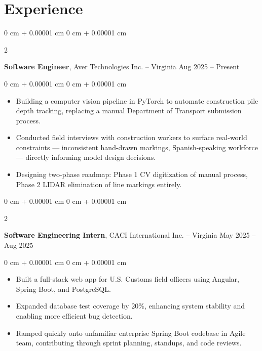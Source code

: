 \documentclass[10pt, letterpaper]{article}
\newenvironment{highlights}{
    \begin{itemize}[
        topsep=0.3 cm,
        parsep=0.05 cm,
        partopsep=0pt,
        itemsep=0pt, 
        leftmargin=0 cm + 10pt
    ]
}{
    \end{itemize}
} %
\newenvironment{onecolentry}{
    \begin{adjustwidth}{
        0 cm + 0.00001 cm
    }{
        0 cm + 0.00001 cm
    }
}{
    \end{adjustwidth}
} %
\newenvironment{twocolentry}[2][]{
    \onecolentry
    \def\secondColumn{#2}
    \setcolumnwidth{\fill, 4.5 cm}
    \begin{paracol}{2}
}{
    \switchcolumn \raggedleft \secondColumn
    \end{paracol}
    \endonecolentry
} %
\begin{document}
    
    \section{Experience}
        \begin{twocolentry}{
            Aug 2025 – Present
        }
            \textbf{Software Engineer}, Aver Technologies Inc. -- Virginia\end{twocolentry}

        \vspace{0.07 cm}
        \begin{onecolentry}
            \begin{highlights}
                \item Building a computer vision pipeline in PyTorch to automate construction pile depth tracking, replacing a manual Department of Transport submission process.
                \item Conducted field interviews with construction workers to surface real-world constraints — inconsistent hand-drawn markings, Spanish-speaking workforce — directly informing model design decisions.
                \item Designing two-phase roadmap: Phase 1 CV digitization of manual process, Phase 2 LIDAR elimination of line markings entirely.

            \end{highlights}
        \end{onecolentry}

        \vspace{0.07 cm}
        
        \begin{twocolentry}{
            May 2025 – Aug 2025
        }
            \textbf{Software Engineering Intern}, CACI International Inc. -- Virginia\end{twocolentry}

        \vspace{0.07 cm}
        \begin{onecolentry}
            \begin{highlights}
                \item Built a full-stack web app for U.S. Customs field officers using Angular, Spring Boot, and PostgreSQL.
                \item Expanded database test coverage by 20\%, enhancing system stability and enabling more efficient bug detection.
                \item Ramped quickly onto unfamiliar enterprise Spring Boot codebase in Agile team, contributing through sprint planning, standups, and code reviews.
            \end{highlights}
        \end{onecolentry}
\end{document}
